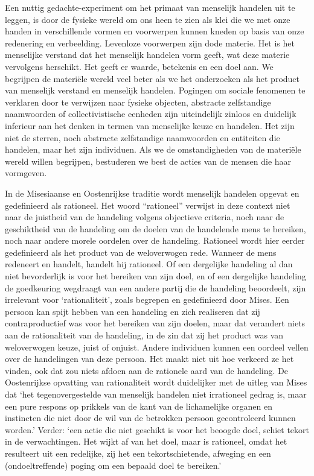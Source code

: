 Een nuttig gedachte-experiment om het primaat van menselijk handelen uit te leggen, is door de fysieke wereld om ons heen te zien als klei die we met onze handen in verschillende vormen en voorwerpen kunnen kneden op basis van onze redenering en verbeelding. Levenloze voorwerpen zijn dode materie. Het is het menselijke verstand dat het menselijk handelen vorm geeft, wat deze materie vervolgens herschikt. Het geeft er waarde, betekenis en een doel aan. We begrijpen de materiële wereld veel beter als we het onderzoeken als het product van menselijk verstand en menselijk handelen. Pogingen om sociale fenomenen te verklaren door te verwijzen naar fysieke objecten, abstracte zelfstandige naamwoorden of collectivistische eenheden zijn uiteindelijk zinloos en duidelijk inferieur aan het denken in termen van menselijke keuze en handelen. Het zijn niet de sterren, noch abstracte zelfstandige naamwoorden en entiteiten die handelen, maar het zijn individuen. Als we de omstandigheden van de materiële wereld willen begrijpen, bestuderen we best de acties van de mensen die haar vormgeven.

In de Misesiaanse en Oostenrijkse traditie wordt menselijk handelen opgevat en gedefinieerd als rationeel. Het woord “rationeel” verwijst in deze context niet naar de juistheid van de handeling volgens objectieve criteria, noch naar de geschiktheid van de handeling om de doelen van de handelende mens te bereiken, noch naar andere morele oordelen over de handeling. Rationeel wordt hier eerder gedefinieerd als het product van de weloverwogen rede. Wanneer de mens redeneert en handelt, handelt hij rationeel. Of een dergelijke handeling al dan niet bevorderlijk is voor het bereiken van zijn doel, en of een dergelijke handeling de goedkeuring wegdraagt van een andere partij die de handeling beoordeelt, zijn irrelevant voor `rationaliteit', zoals begrepen en gedefinieerd door Mises. Een persoon kan spijt hebben van een handeling en zich realiseren dat zij contraproductief was voor het bereiken van zijn doelen, maar dat verandert niets aan de rationaliteit van de handeling, in de zin dat zij het product was van weloverwogen keuze, juist of onjuist. Andere individuen kunnen een oordeel vellen over de handelingen van deze persoon. Het maakt niet uit hoe verkeerd ze het vinden, ook dat zou niets afdoen aan de rationele aard van de handeling. De Oostenrijkse opvatting van rationaliteit wordt duidelijker met de uitleg van Mises dat `het tegenovergestelde van menselijk handelen niet irrationeel gedrag is, maar een pure respons op prikkels van de kant van de lichamelijke organen en instincten die niet door de wil van de betrokken persoon gecontroleerd kunnen worden.' Verder: `een actie die niet geschikt is voor het beoogde doel, schiet tekort in de verwachtingen. Het wijkt af van het doel, maar is rationeel, omdat het resulteert uit een redelijke, zij het een tekortschietende, afweging en een (ondoeltreffende) poging om een bepaald doel te bereiken.'\autocite{6}

